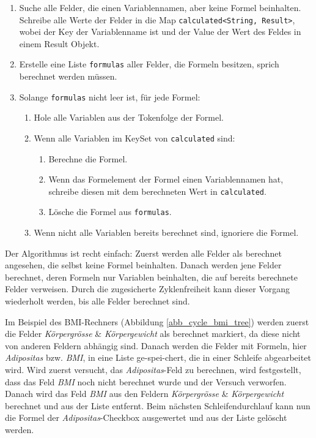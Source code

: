 \begin{enumerate}
	\item Suche alle Felder, die einen Variablennamen, aber keine Formel beinhalten. Schreibe alle Werte der Felder in die Map \texttt{calculated<String, 			Result>}, wobei der Key der Variablenname ist und der Value der Wert des Feldes in einem Result Objekt.
	\item Erstelle eine Liste \texttt{formulas} aller Felder, die Formeln besitzen, sprich berechnet werden müssen.
	\item Solange \texttt{formulas} nicht leer ist, für jede Formel:
	
	\begin{enumerate}
		\item Hole alle Variablen aus der Tokenfolge der Formel.
		\item Wenn alle Variablen im KeySet von \texttt{calculated} sind:
		\begin{enumerate}
			\item Berechne die Formel.
			\item Wenn das Formelement der Formel einen Variablennamen hat, schreibe diesen mit dem berechneten Wert in \texttt{calculated}.
			\item Lösche die Formel aus \texttt{formulas}.
		\end{enumerate}	
		\item Wenn nicht alle Variablen bereits berechnet sind, ignoriere die Formel.
	\end{enumerate}	
	
\end{enumerate}

Der Algorithmus ist recht einfach: Zuerst werden alle Felder als berechnet angesehen, die selbst keine Formel beinhalten. Danach werden jene Felder berechnet, deren Formeln nur Variablen beinhalten, die auf bereits berechnete Felder verweisen. Durch die zugesicherte Zyklenfreiheit kann dieser Vorgang wiederholt werden, bis alle Felder berechnet sind.

Im Beispiel des BMI-Rechners (Abbildung \ref{abb_cycle_bmi_tree}) werden zuerst die Felder \emph{Körpergrösse} \& \emph{Körpergewicht} als berechnet markiert, da diese nicht von anderen Feldern abhängig sind. Danach werden die Felder mit Formeln, hier \emph{Adipositas} bzw. \emph{BMI}, in eine Liste ge-spei-chert, die in einer Schleife abgearbeitet wird. Wird zuerst versucht, das \emph{Adipositas}-Feld zu berechnen, wird festgestellt, dass das Feld \emph{BMI} noch nicht berechnet wurde und der Versuch verworfen. Danach wird das Feld \emph{BMI} aus den Feldern \emph{Körpergrösse} \& \emph{Körpergewicht} berechnet und aus der Liste entfernt. Beim nächsten Schleifendurchlauf kann nun die Formel der \emph{Adipositas}-Checkbox ausgewertet und aus der Liste gelöscht werden.

